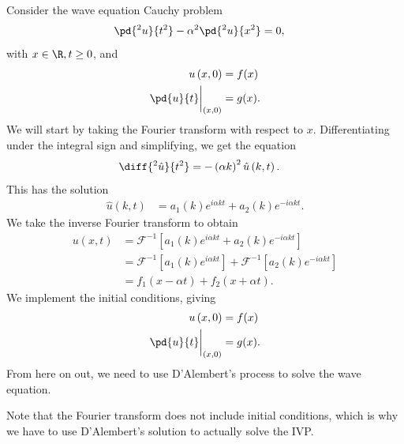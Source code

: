 \documentclass[10pt]{mypackage}
\begin{document}
\begin{example}
  Consider the wave equation Cauchy problem
  \begin{align*}
    \pd{^2u}{t^2} - \alpha^2\pd{^2u}{x^2} &= 0,
  \end{align*}
  with $x\in\R,t\geq 0$, and
  \begin{align*}
    u\left( x,0 \right) &= f(x)\\
    \pd{u}{t}\biggr\vert_{(x,0)} &= g(x).
  \end{align*}
  We will start by taking the Fourier transform with respect to $x$. Differentiating under the integral sign and simplifying, we get the equation
  \begin{align*}
    \diff{^2\hat{u}}{t^2} &= -\left( \alpha k \right)^2\hat{u}\left( k,t \right).
  \end{align*}
  This has the solution
  \begin{align*}
    \hat{u}\left( k,t \right) &= a_1(k) e^{i\alpha k t} + a_2(k)e^{-i\alpha k t}.
  \end{align*}
  We take the inverse Fourier transform to obtain
  \begin{align*}
    u\left( x,t \right) &= \mathcal{F}^{-1}\left[ a_1(k)e^{i\alpha k t} + a_2(k)e^{-i\alpha k t} \right]\\
                        &= \mathcal{F}^{-1}\left[ a_1(k)e^{i\alpha k t} \right] + \mathcal{F}^{-1}\left[ a_2(k)e^{-i\alpha k t} \right]\\
                        &= f_1\left( x-\alpha t \right) + f_2\left( x+\alpha t \right).
  \end{align*}
  We implement the initial conditions, giving
  \begin{align*}
    u\left( x,0 \right) &= f(x)\\
    \pd{u}{t}\biggr\vert_{(x,0)} &= g(x).
  \end{align*}
  From here on out, we need to use D'Alembert's process to solve the wave equation.
\end{example}
\begin{remark}
  Note that the Fourier transform does not include initial conditions, which is why we have to use D'Alembert's solution to actually solve the IVP.
\end{remark}
\end{document}
